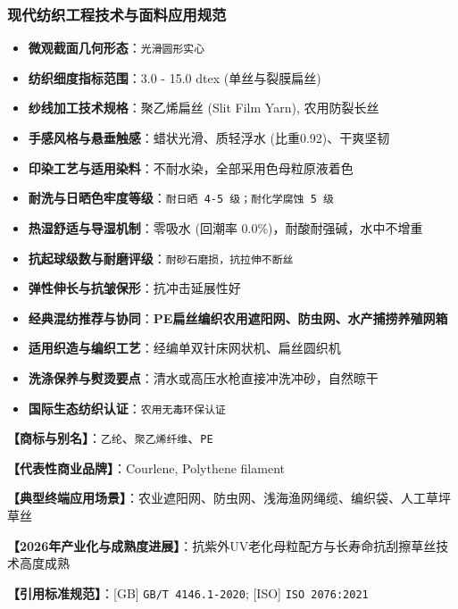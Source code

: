 \documentclass[11pt,openright,twoside,UTF8]{ctexbook}
\begin{document}
\subsubsection*{现代纺织工程技术与面料应用规范}
\begin{itemize} \setlength{\itemsep}{2pt}
    \item \textbf{微观截面几何形态}：\texttt{光滑圆形实心}
    \item \textbf{纺织细度指标范围}：3.0 - 15.0 dtex (单丝与裂膜扁丝)
    \item \textbf{纱线加工技术规格}：聚乙烯扁丝 (Slit Film Yarn), 农用防裂长丝
    \item \textbf{手感风格与悬垂触感}：蜡状光滑、质轻浮水 (比重0.92)、干爽坚韧
    \item \textbf{印染工艺与适用染料}：不耐水染，全部采用色母粒原液着色
    \item \textbf{耐洗与日晒色牢度等级}：\texttt{耐日晒 4-5 级；耐化学腐蚀 5 级}
    \item \textbf{热湿舒适与导湿机制}：零吸水 (回潮率 0.0\%)，耐酸耐强碱，水中不增重
    \item \textbf{抗起球级数与耐磨评级}：\texttt{耐砂石磨损，抗拉伸不断丝}
    \item \textbf{弹性伸长与抗皱保形}：抗冲击延展性好
    \item \textbf{经典混纺推荐与协同}：\textbf{PE扁丝编织农用遮阳网、防虫网、水产捕捞养殖网箱}
    \item \textbf{适用织造与编织工艺}：经编单双针床网状机、扁丝圆织机
    \item \textbf{洗涤保养与熨烫要点}：清水或高压水枪直接冲洗冲砂，自然晾干
    \item \textbf{国际生态纺织认证}：\texttt{农用无毒环保认证}
\end{itemize}
\vspace{0.2cm}

\noindent\textbf{【商标与别名】}：\texttt{乙纶}、\texttt{聚乙烯纤维}、\texttt{PE}\par
\noindent\textbf{【代表性商业品牌】}：Courlene, Polythene filament\par
\noindent\textbf{【典型终端应用场景】}：农业遮阳网、防虫网、浅海渔网绳缆、编织袋、人工草坪草丝\par
\noindent\textbf{【2026年产业化与成熟度进展】}：抗紫外UV老化母粒配方与长寿命抗刮擦草丝技术高度成熟\par
\noindent\textbf{【引用标准规范】}：[GB] \texttt{GB/T 4146.1-2020}; [ISO] \texttt{ISO 2076:2021}\par
\vspace{0.5cm}
\end{document}
